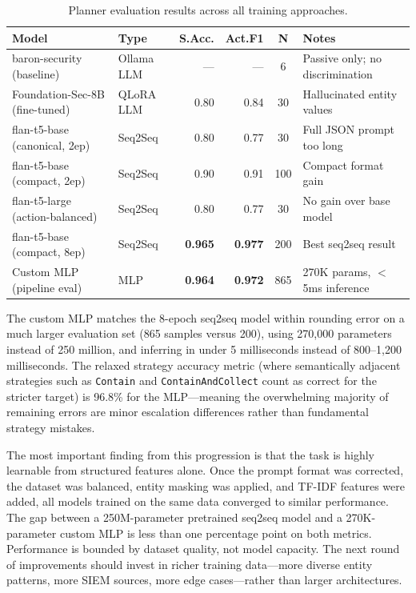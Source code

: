 \begin{table}[h]
\centering
\caption{Planner evaluation results across all training approaches.}
\label{tab:planner-results}
\footnotesize
\begin{tabular}{L{3.8cm}L{1.9cm}rrcL{3.3cm}}
\hline
\textbf{Model} & \textbf{Type} & \textbf{S.Acc.} & \textbf{Act.F1} & \textbf{N} & \textbf{Notes} \\
\hline
baron-security (baseline)       & Ollama LLM  & ---            & ---            & 6   & Passive only; no discrimination \\
Foundation-Sec-8B (fine-tuned)  & QLoRA LLM   & 0.80           & 0.84           & 30  & Hallucinated entity values \\
flan-t5-base (canonical, 2ep)   & Seq2Seq     & 0.80           & 0.77           & 30  & Full JSON prompt too long \\
flan-t5-base (compact, 2ep)     & Seq2Seq     & 0.90           & 0.91           & 100 & Compact format gain \\
flan-t5-large (action-balanced) & Seq2Seq     & 0.80           & 0.77           & 30  & No gain over base model \\
flan-t5-base (compact, 8ep)     & Seq2Seq     & \textbf{0.965} & \textbf{0.977} & 200 & Best seq2seq result \\
Custom MLP (pipeline eval)      & MLP         & \textbf{0.964} & \textbf{0.972} & 865 & 270K params, $<$5ms inference \\
\hline
\end{tabular}
\normalsize
\end{table}

The custom MLP matches the 8-epoch seq2seq model within rounding error on a much larger evaluation set (865 samples versus 200), using 270,000 parameters instead of 250 million, and inferring in under 5 milliseconds instead of 800--1,200 milliseconds. The relaxed strategy accuracy metric (where semantically adjacent strategies such as \texttt{Contain} and \texttt{ContainAndCollect} count as correct for the stricter target) is 96.8\% for the MLP---meaning the overwhelming majority of remaining errors are minor escalation differences rather than fundamental strategy mistakes.

The most important finding from this progression is that the task is highly learnable from structured features alone. Once the prompt format was corrected, the dataset was balanced, entity masking was applied, and TF-IDF features were added, all models trained on the same data converged to similar performance. The gap between a 250M-parameter pretrained seq2seq model and a 270K-parameter custom MLP is less than one percentage point on both metrics. Performance is bounded by dataset quality, not model capacity. The next round of improvements should invest in richer training data---more diverse entity patterns, more SIEM sources, more edge cases---rather than larger architectures.

